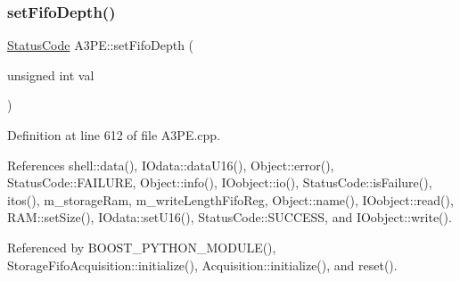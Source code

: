 \subsubsection{\texorpdfstring{set\+Fifo\+Depth()}{setFifoDepth()}}
{\footnotesize\ttfamily \hyperlink{classStatusCode}{Status\+Code} A3\+P\+E\+::set\+Fifo\+Depth (\begin{DoxyParamCaption}\item[{unsigned int}]{val }\end{DoxyParamCaption})}



Definition at line 612 of file A3\+P\+E.\+cpp.



References shell\+::data(), I\+Odata\+::data\+U16(), Object\+::error(), Status\+Code\+::\+F\+A\+I\+L\+U\+RE, Object\+::info(), I\+Oobject\+::io(), Status\+Code\+::is\+Failure(), itos(), m\+\_\+storage\+Ram, m\+\_\+write\+Length\+Fifo\+Reg, Object\+::name(), I\+Oobject\+::read(), R\+A\+M\+::set\+Size(), I\+Odata\+::set\+U16(), Status\+Code\+::\+S\+U\+C\+C\+E\+SS, and I\+Oobject\+::write().



Referenced by B\+O\+O\+S\+T\+\_\+\+P\+Y\+T\+H\+O\+N\+\_\+\+M\+O\+D\+U\+L\+E(), Storage\+Fifo\+Acquisition\+::initialize(), Acquisition\+::initialize(), and reset().



